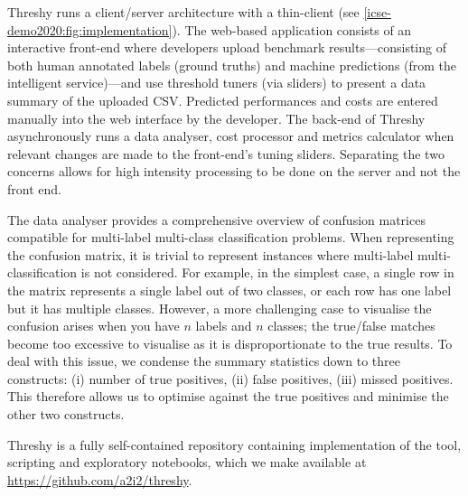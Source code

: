 




Threshy runs a client/server architecture with a thin-client (see \cref{icse-demo2020:fig:implementation}). The web-based application consists of an interactive front-end where developers upload benchmark results---consisting of both human annotated labels (ground truths) and machine predictions (from the intelligent service)---and use threshold tuners (via sliders) to present a data summary of the uploaded CSV. Predicted performances and costs are entered manually into the web interface by the developer. The back-end of Threshy asynchronously runs a data analyser, cost processor and metrics calculator when relevant changes are made to the front-end's tuning sliders. Separating the two concerns allows for high intensity processing to be done on the server and not the front end.

The data analyser provides a comprehensive overview of confusion matrices compatible for multi-label multi-class classification problems. When representing the confusion matrix, it is trivial to represent instances where multi-label multi-classification is not considered. For example, in the simplest case, a single row in the matrix represents a single label out of two classes, or each row has one label but it has multiple classes. However, a more challenging case to visualise the confusion arises when you have $n$ labels and $n$ classes; the true/false matches become too excessive to visualise as it is disproportionate to the true results.  To deal with this issue, we condense the summary statistics down to three constructs: (i) number of true positives, (ii) false positives, (iii) missed positives. This therefore allows us to optimise against the true positives and minimise the other two constructs. 

Threshy is a fully self-contained repository containing implementation of the tool, scripting and exploratory notebooks, which we make available at \url{https://github.com/a2i2/threshy}.


